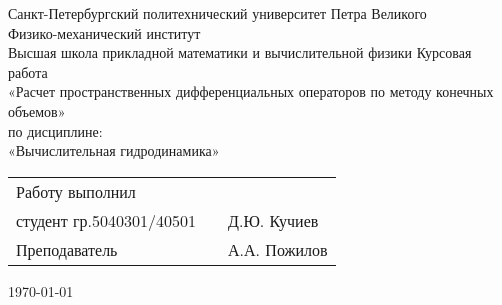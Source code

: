 \begin{center}
\thispagestyle{empty}
Санкт-Петербургский политехнический университет Петра Великого \\
Физико-механический институт \\
Высшая школа прикладной математики и вычислительной физики
\vfill
\Large{Курсовая работа\\
«Расчет пространственных дифференциальных операторов по методу
конечных объемов»\\
по дисциплине:\\
«Вычислительная гидродинамика»}
\vfill

\normalsize

\mbox{}\hfill
\begin{tabular}{lp{5em}l}
Работу выполнил & & \\
студент гр.5040301/40501 & & Д.Ю. Кучиев\\[2ex]
Преподаватель & & А.А. Пожилов \\
\end{tabular}
\vfill \today
\end{center}